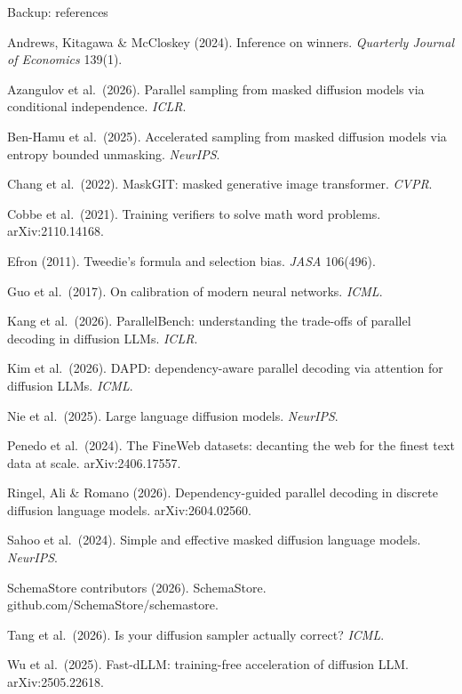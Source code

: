 \documentclass[aspectratio=169,10pt,t]{beamer}
\begin{document}
\begin{frame}{Backup: references}
  \vspace{1.5mm}
  \scriptsize
  \setlength{\parskip}{2.4pt}
  \raggedright\color{ink2}
  Andrews, Kitagawa \& McCloskey (2024). Inference on winners. \emph{Quarterly Journal of Economics} 139(1).\par
  Azangulov et al.\ (2026). Parallel sampling from masked diffusion models via conditional independence. \emph{ICLR}.\par
  Ben-Hamu et al.\ (2025). Accelerated sampling from masked diffusion models via entropy bounded unmasking. \emph{NeurIPS}.\par
  Chang et al.\ (2022). MaskGIT: masked generative image transformer. \emph{CVPR}.\par
  Cobbe et al.\ (2021). Training verifiers to solve math word problems. arXiv:2110.14168.\par
  Efron (2011). Tweedie's formula and selection bias. \emph{JASA} 106(496).\par
  Guo et al.\ (2017). On calibration of modern neural networks. \emph{ICML}.\par
  Kang et al.\ (2026). ParallelBench: understanding the trade-offs of parallel decoding in diffusion LLMs. \emph{ICLR}.\par
  Kim et al.\ (2026). DAPD: dependency-aware parallel decoding via attention for diffusion LLMs. \emph{ICML}.\par
  Nie et al.\ (2025). Large language diffusion models. \emph{NeurIPS}.\par
  Penedo et al.\ (2024). The FineWeb datasets: decanting the web for the finest text data at scale. arXiv:2406.17557.\par
  Ringel, Ali \& Romano (2026). Dependency-guided parallel decoding in discrete diffusion language models. arXiv:2604.02560.\par
  Sahoo et al.\ (2024). Simple and effective masked diffusion language models. \emph{NeurIPS}.\par
  SchemaStore contributors (2026). SchemaStore. github.com/SchemaStore/schemastore.\par
  Tang et al.\ (2026). Is your diffusion sampler actually correct? \emph{ICML}.\par
  Wu et al.\ (2025). Fast-dLLM: training-free acceleration of diffusion LLM. arXiv:2505.22618.\par
\end{frame}
\end{document}
